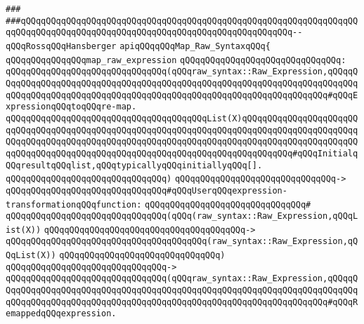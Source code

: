 \verb|###|\newline
\verb|###qQQqqQQqqQQqqQQqqQQqqQQqqQQqqQQqqQQqqQQqqQQqqQQqqQQqqQQqqQQqqQQqqQQqqQQqqQQqqQQqqQQqqQQqqQQqqQQqqQQqqQQqqQQqqQQqqQQqqQQqqQQq--qQQqRossqQQqHansberger|\newline
\newline
\newline
\newline
\verb|apiqQQqqQQqMap_Raw_SyntaxqQQq{|\newline
\newline
\verb|qQQqqQQqqQQqqQQqmap_raw_expression|\newline
\verb|qQQqqQQqqQQqqQQqqQQqqQQqqQQqqQQq:|\newline
\verb|qQQqqQQqqQQqqQQqqQQqqQQqqQQqqQQq(qQQqraw_syntax::Raw_Expression,qQQqqQQqqQQqqQQqqQQqqQQqqQQqqQQqqQQqqQQqqQQqqQQqqQQqqQQqqQQqqQQqqQQqqQQqqQQqqQQqqQQqqQQqqQQqqQQqqQQqqQQqqQQqqQQqqQQqqQQqqQQqqQQqqQQqqQQqqQQq#qQQqExpressionqQQqtoqQQqre-map.|\newline
\verb|qQQqqQQqqQQqqQQqqQQqqQQqqQQqqQQqqQQqqQQqList(X)qQQqqQQqqQQqqQQqqQQqqQQqqQQqqQQqqQQqqQQqqQQqqQQqqQQqqQQqqQQqqQQqqQQqqQQqqQQqqQQqqQQqqQQqqQQqqQQqqQQqqQQqqQQqqQQqqQQqqQQqqQQqqQQqqQQqqQQqqQQqqQQqqQQqqQQqqQQqqQQqqQQqqQQqqQQqqQQqqQQqqQQqqQQqqQQqqQQqqQQqqQQqqQQqqQQqqQQqqQQq#qQQqInitialqQQqresultqQQqlist,qQQqtypicallyqQQqinitiallyqQQq[].|\newline
\verb|qQQqqQQqqQQqqQQqqQQqqQQqqQQqqQQq)|\newline
\verb|qQQqqQQqqQQqqQQqqQQqqQQqqQQqqQQq->|\newline
\verb|qQQqqQQqqQQqqQQqqQQqqQQqqQQqqQQq#qQQqUserqQQqexpression-transformationqQQqfunction:|\newline
\verb|qQQqqQQqqQQqqQQqqQQqqQQqqQQqqQQq#|\newline
\verb|qQQqqQQqqQQqqQQqqQQqqQQqqQQqqQQq(qQQq(raw_syntax::Raw_Expression,qQQqList(X))|\newline
\verb|qQQqqQQqqQQqqQQqqQQqqQQqqQQqqQQqqQQqqQQq->|\newline
\verb|qQQqqQQqqQQqqQQqqQQqqQQqqQQqqQQqqQQqqQQq(raw_syntax::Raw_Expression,qQQqList(X))|\newline
\verb|qQQqqQQqqQQqqQQqqQQqqQQqqQQqqQQq)|\newline
\verb|qQQqqQQqqQQqqQQqqQQqqQQqqQQqqQQq->|\newline
\verb|qQQqqQQqqQQqqQQqqQQqqQQqqQQqqQQq(qQQqraw_syntax::Raw_Expression,qQQqqQQqqQQqqQQqqQQqqQQqqQQqqQQqqQQqqQQqqQQqqQQqqQQqqQQqqQQqqQQqqQQqqQQqqQQqqQQqqQQqqQQqqQQqqQQqqQQqqQQqqQQqqQQqqQQqqQQqqQQqqQQqqQQqqQQqqQQq#qQQqRemappedqQQqexpression.|\newline

